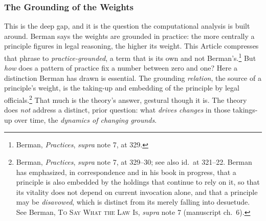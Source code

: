 \subsubsection{The Grounding of the Weights}

This is the deep gap, and it is the question the computational analysis is
built around. Berman says the weights are grounded in practice: the more centrally a
principle figures in legal reasoning, the higher its weight. This Article
compresses that phrase to \textit{practice-grounded}, a term that is its own
and not Berman's.\footnote{Berman, \textit{Practices}, \textit{supra} note 7, at 329.} But \textit{how} does a pattern of practice fix
a number between zero and one? Here a distinction Berman has drawn is
essential. The grounding \textit{relation}, the source of a principle's
weight, is the taking-up and embedding of the principle by legal officials.\footnote{Berman, \textit{Practices}, \textit{supra} note 7, at 329--30; see also
id.\ at 321--22. Berman has emphasized, in
correspondence and in his book in progress, that a principle is also
embedded by the holdings that continue to rely on it, so that its vitality
does not depend on current invocation alone, and that a principle may be
\textit{disavowed}, which is distinct from its merely falling into
desuetude. See Berman, \textsc{To Say What the Law Is}, \textit{supra}
note 7 (manuscript ch.\ 6).} That much is the theory's answer, gestural though it is. The theory does
\textit{not} address a distinct, prior question: what \textit{drives changes} in those takings-up over time, the
\textit{dynamics of changing grounds}.

